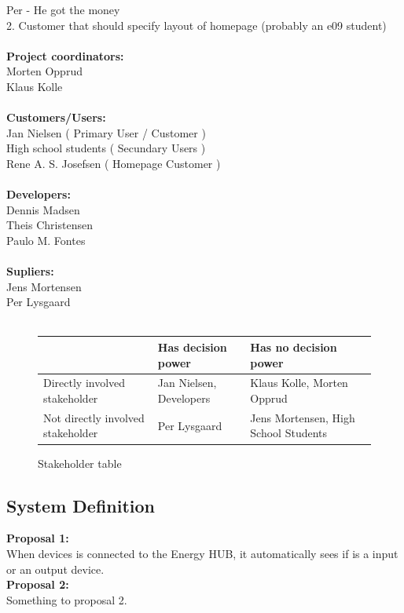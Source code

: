 Per - He got the money\\
2. Customer that should specify layout of homepage (probably an e09 student)\\
\\
\textbf{Project coordinators:}\\
Morten Opprud\\
Klaus Kolle\\
\\
\textbf{Customers/Users:}\\
Jan Nielsen ( Primary User / Customer )\\
High school students ( Secundary Users )\\
Rene A. S. Josefsen ( Homepage Customer )\\
\\
\textbf{Developers:}\\
Dennis Madsen\\
Theis Christensen\\
Paulo M. Fontes\\
\\
\textbf{Supliers:}\\
Jens Mortensen\\
Per Lysgaard\\
\\

\begin{figure}[h!]
 \begin{centering}
  \begin{tabular}{| l | l | l | }
   \hline
      & Has decision power & Has no decision power \\ \hline
    Directly involved stakeholder & Jan Nielsen, Developers & Klaus Kolle,
    Morten Opprud\\ \hline Not directly involved stakeholder & Per Lysgaard & Jens Mortensen, High School Students \\
    \hline
   \end{tabular}
  \end{centering}
 \caption{Stakeholder table}
\end{figure}

\subsection{System Definition}
\textbf{Proposal 1:}\\	
When devices is connected to the Energy HUB, it automatically sees if is a input
or an output device.
\\\textbf{Proposal 2:}\\
Something to proposal 2.\\
